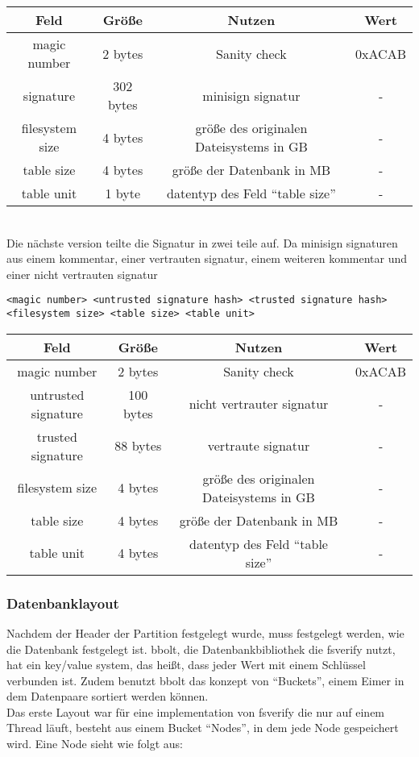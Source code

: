 \begin{center}
  \begin{tabular}{|c | c | c | c|}
    \hline
    Feld & Größe & Nutzen & Wert \\ [0.5ex]
    \hline
    magic number & 2 bytes & Sanity check & 0xACAB \\
    \hline
    signature & 302 bytes & minisign signatur & - \\
    \hline
    filesystem size & 4 bytes & größe des originalen Dateisystems in GB & - \\
    \hline
    table size & 4 bytes & größe der Datenbank in MB & - \\
    \hline
    table unit & 1 byte & datentyp des Feld ``table size'' & - \\
    \hline
  \end{tabular}
\end{center}
\hfill \break
\\
Die nächste version teilte die Signatur in zwei teile auf. Da minisign signaturen aus einem kommentar, einer vertrauten signatur, einem weiteren kommentar und einer nicht vertrauten signatur
\begin{verbatim}
<magic number> <untrusted signature hash> <trusted signature hash>
<filesystem size> <table size> <table unit>
\end{verbatim}

\begin{center}
  \begin{tabular}{|c | c | c | c|}
    \hline
    Feld & Größe & Nutzen & Wert \\ [0.5ex]
    \hline
    magic number & 2 bytes & Sanity check & 0xACAB \\
    \hline
    untrusted signature & 100 bytes & nicht vertrauter signatur & - \\
    \hline
    trusted signature & 88 bytes & vertraute signatur & - \\
    \hline
    filesystem size & 4 bytes & größe des originalen Dateisystems in GB & - \\
    \hline
    table size & 4 bytes & größe der Datenbank in MB & - \\
    \hline
    table unit & 4 bytes & datentyp des Feld ``table size'' & - \\
    \hline
  \end{tabular}
\end{center}

\subsubsection{Datenbanklayout}
Nachdem der Header der Partition festgelegt wurde, muss festgelegt werden, wie die Datenbank festgelegt ist.
bbolt, die Datenbankbibliothek die fsverify nutzt, hat ein key/value system, das heißt, dass jeder Wert mit einem Schlüssel verbunden ist. Zudem benutzt bbolt das konzept von ``Buckets'', einem Eimer in dem Datenpaare sortiert werden können.\\
Das erste Layout war für eine implementation von fsverify die nur auf einem Thread läuft, besteht aus einem Bucket ``Nodes'', in dem jede Node gespeichert wird.
Eine Node sieht wie folgt aus:

